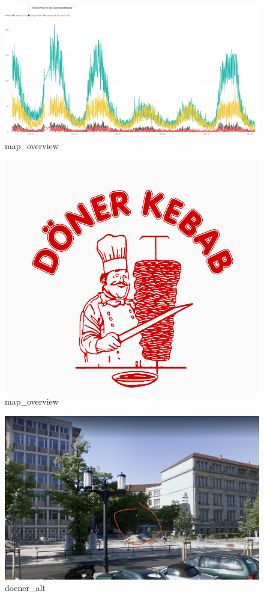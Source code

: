 \documentclass[11pt]{article}
\makeatletter
\def\maxwidth{\ifdim\Gin@nat@width>\linewidth\linewidth
    \else\Gin@nat@width\fi}
\let\Oldincludegraphics\includegraphics
\renewcommand{\includegraphics}[1]{\Oldincludegraphics[width=.8\maxwidth]{#1}}
\makeatother
\begin{document}
    \begin{figure}
\centering
\includegraphics{images/wifi_connection_density.png}
\caption{map\_overview}
\end{figure}

    \begin{figure}
\centering
\includegraphics{images/doener.jpg}
\caption{map\_overview}
\end{figure}

    \begin{figure}
\centering
\includegraphics{images/doener_alt.png}
\caption{doener\_alt}
\end{figure}
\end{document}
